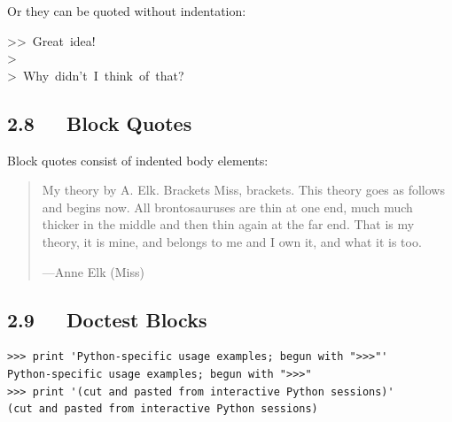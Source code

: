 \documentclass[10pt,a4paper,english]{article}
\begin{document}
Or they can be quoted without indentation:
\begin{ttfamily}\begin{flushleft}
>>~Great~idea!~\\
>~\\
>~Why~didn't~I~think~of~that?
\end{flushleft}\end{ttfamily}



\hypertarget{block-quotes}{}
\subsection*{2.8~~~Block Quotes}

Block quotes consist of indented body elements:
\begin{quote}

My theory by A. Elk.  Brackets Miss, brackets.  This theory goes
as follows and begins now.  All brontosauruses are thin at one
end, much much thicker in the middle and then thin again at the
far end.  That is my theory, it is mine, and belongs to me and I
own it, and what it is too.

\begin{flushright}
---Anne Elk (Miss)
\end{flushright}
\end{quote}



\hypertarget{doctest-blocks}{}
\subsection*{2.9~~~Doctest Blocks}
\begin{verbatim}>>> print 'Python-specific usage examples; begun with ">>>"'
Python-specific usage examples; begun with ">>>"
>>> print '(cut and pasted from interactive Python sessions)'
(cut and pasted from interactive Python sessions)\end{verbatim}



\hypertarget{footnotes}{}
\end{document}
